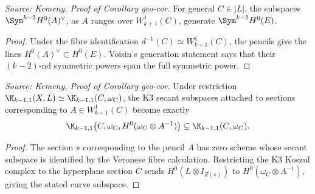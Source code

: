 \begin{lemma}
  \label{lem:kemeny_voisin_generation_observation}
  \textit{Source: Kemeny, Proof of Corollary geo-cor.}
  For general \(C\in |L|\), the subspaces
  \(\Sym^{k-2}H^0(A)^\vee\), as \(A\) ranges over \(W^1_{k+1}(C)\), generate
  \(\Sym^{k-2}H^0(E)\).
\end{lemma}
\begin{proof}
  Under the fibre identification \(d^{-1}(C)\simeq W^1_{k+1}(C)\), the pencils
  give the lines \(H^0(A)^\vee\subset H^0(E)\).  Voisin's generation statement
  says that their \((k-2)\)-nd symmetric powers span the full symmetric power.
\end{proof}

\begin{lemma}
  \label{lem:kemeny_restrict_k3_syzygies_to_curve}
  \textit{Source: Kemeny, Proof of Corollary geo-cor.}
  Under restriction
  \(\K_{k-1,1}(X,L)\simeq \K_{k-1,1}(C,\omega_C)\), the K3 secant subspaces
  attached to sections corresponding to \(A\in W^1_{k+1}(C)\) become exactly
  \[
    \K_{k-1,1}\bigl(C,\omega_C,H^0(\omega_C\otimes A^{-1})\bigr)
    \subseteq \K_{k-1,1}(C,\omega_C).
  \]
\end{lemma}
\begin{proof}
  The section \(s\) corresponding to the pencil \(A\) has zero scheme whose
  secant subspace is identified by the Veronese fibre calculation.  Restricting
  the K3 Koszul complex to the hyperplane section \(C\) sends
  \(H^0(L\otimes I_{Z(s)})\) to \(H^0(\omega_C\otimes A^{-1})\), giving the
  stated curve subspace.
\end{proof}

